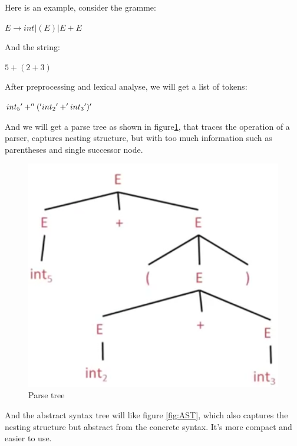         Here is an example, consider the gramme:
           
           $E \rightarrow int |(E)| E + E $
            
            And the string:
            
            $5+(2+3)$
           
            After preprocessing and lexical analyse, we will get a list of tokens:
            
            $int\textsubscript{5}'+''('int\textsubscript{2}'+'int\textsubscript{3}')'$
            
            
            And we will get a parse tree as shown in figure\ref{fig:parseTree}, that traces the operation of a parser, captures nesting structure, but with too much information such as parentheses and single successor node.  
             \begin{figure}[H]
                \centering
                \includegraphics[scale = 0.25]
                {Images/concepts/parseTree.png}
                \caption[ parseTree]%
                { Parse tree\footnotemark}
                \label{fig:parseTree}
            \end{figure}
            
            
            And the abstract syntax tree will like figure \ref{fig:AST}, which also captures the nesting structure but abstract from the concrete syntax. It's more compact and easier to use.
        
